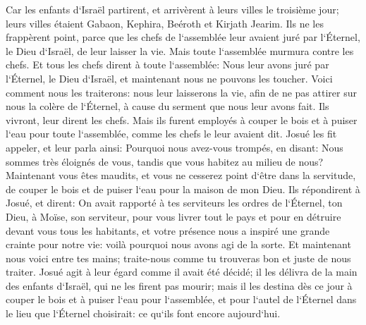 \verse Car les enfants d`Israël partirent, et arrivèrent à leurs villes le troisième jour; leurs villes étaient Gabaon, Kephira, Beéroth et Kirjath Jearim. 
\verse Ils ne les frappèrent point, parce que les chefs de l`assemblée leur avaient juré par l`Éternel, le Dieu d`Israël, de leur laisser la vie. Mais toute l`assemblée murmura contre les chefs. 
\verse Et tous les chefs dirent à toute l`assemblée: Nous leur avons juré par l`Éternel, le Dieu d`Israël, et maintenant nous ne pouvons les toucher. 
\verse Voici comment nous les traiterons: nous leur laisserons la vie, afin de ne pas attirer sur nous la colère de l`Éternel, à cause du serment que nous leur avons fait. 
\verse Ils vivront, leur dirent les chefs. Mais ils furent employés à couper le bois et à puiser l`eau pour toute l`assemblée, comme les chefs le leur avaient dit. 
\verse Josué les fit appeler, et leur parla ainsi: Pourquoi nous avez-vous trompés, en disant: Nous sommes très éloignés de vous, tandis que vous habitez au milieu de nous? 
\verse Maintenant vous êtes maudits, et vous ne cesserez point d`être dans la servitude, de couper le bois et de puiser l`eau pour la maison de mon Dieu. 
\verse Ils répondirent à Josué, et dirent: On avait rapporté à tes serviteurs les ordres de l`Éternel, ton Dieu, à Moïse, son serviteur, pour vous livrer tout le pays et pour en détruire devant vous tous les habitants, et votre présence nous a inspiré une grande crainte pour notre vie: voilà pourquoi nous avons agi de la sorte. 
\verse Et maintenant nous voici entre tes mains; traite-nous comme tu trouveras bon et juste de nous traiter. 
\verse Josué agit à leur égard comme il avait été décidé; il les délivra de la main des enfants d`Israël, qui ne les firent pas mourir; 
\verse mais il les destina dès ce jour à couper le bois et à puiser l`eau pour l`assemblée, et pour l`autel de l`Éternel dans le lieu que l`Éternel choisirait: ce qu`ils font encore aujourd`hui. 

\chapter{}

